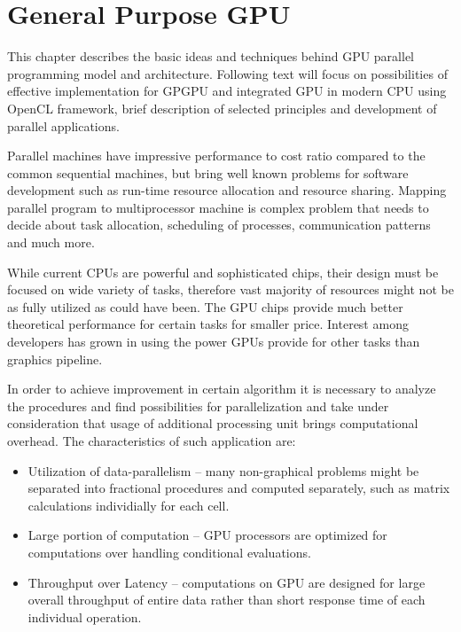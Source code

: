 \chapter{General Purpose GPU}\label{chapter:gpgpu}
This chapter describes the basic ideas and techniques behind GPU parallel 
programming model and architecture. Following text will focus on possibilities
of effective implementation for GPGPU and integrated GPU in modern CPU using 
OpenCL framework, brief description of selected principles and development of
parallel applications. 

Parallel machines have impressive performance to cost ratio compared to the
common sequential machines\cite{Darlington93structuredparallel}, but bring well
known problems for software development such as run-time resource allocation
and resource sharing. Mapping parallel program to multiprocessor machine is
complex problem that needs to decide about task allocation, scheduling of
processes, communication patterns and much more.

While current CPUs are powerful and sophisticated chips, their design must be
focused on wide variety of tasks, therefore vast majority of resources might
not be as fully utilized as could have been. The GPU chips provide much better
theoretical performance for certain tasks for smaller 
price\cite{Owens:2007:ASO}. Interest among developers has grown in using the 
power GPUs provide for other tasks than graphics pipeline. 

In order to achieve improvement in certain algorithm it is necessary to analyze
the procedures and find possibilities for parallelization and take under 
consideration that usage of additional processing unit brings computational 
overhead. The characteristics of such application are\cite{Owens:2008:GC}:

\begin{itemize}
\item Utilization of data-parallelism -- many non-graphical problems might be
separated into fractional procedures and computed separately, such as matrix 
calculations individially for each cell.
\item Large portion of computation -- GPU processors are optimized for 
computations over handling conditional evaluations.
\item Throughput over Latency -- computations on GPU are designed for large
overall throughput of entire data rather than short response time of each 
individual operation.
\end{itemize}

